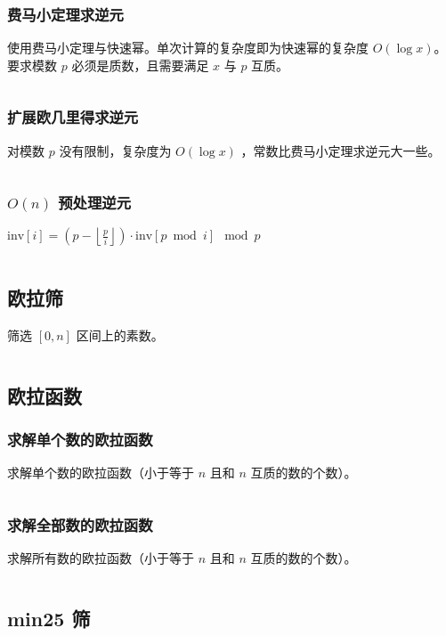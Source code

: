 \documentclass[a4paper, twoside]{article}
\begin{document}
    \subsubsection{费马小定理求逆元}
    使用费马小定理与快速幂。单次计算的复杂度即为快速幂的复杂度 $O(\log x)$。要求模数 $p$ 必须是质数，且需要满足 $x$ 与 $p$ 互质。
    \inputminted{cpp}{../src/数论/费马小定理求逆元.cpp}

    \subsubsection{扩展欧几里得求逆元}
    对模数 $p$ 没有限制，复杂度为 $O(\log x)$ ，常数比费马小定理求逆元大一些。
    \inputminted{cpp}{../src/数论/扩展欧几里得求逆元.cpp}

    \subsubsection{$O(n)$ 预处理逆元}
    $\text{inv}[i] = (p - \left\lfloor \frac{p}{i} \right\rfloor) \cdot \text{inv}[p \bmod i] \mod p$
    \inputminted{cpp}{../src/数论/O(n)预处理逆元.cpp}

\subsection{欧拉筛}
筛选 $[0,n]$ 区间上的素数。
\inputminted{cpp}{../src/数论/欧拉筛.cpp}

\subsection{欧拉函数}
    \subsubsection{求解单个数的欧拉函数}
    求解单个数的欧拉函数（小于等于 $n$ 且和 $n$ 互质的数的个数）。
    \inputminted{cpp}{../src/数论/欧拉函数（求解单个数的欧拉函数）.cpp}

    \subsubsection{求解全部数的欧拉函数}
    求解所有数的欧拉函数（小于等于 $n$ 且和 $n$ 互质的数的个数）。
    \inputminted{cpp}{../src/数论/欧拉函数（求解全部数的欧拉函数）.cpp}

\subsection{min25 筛}
\end{document}
